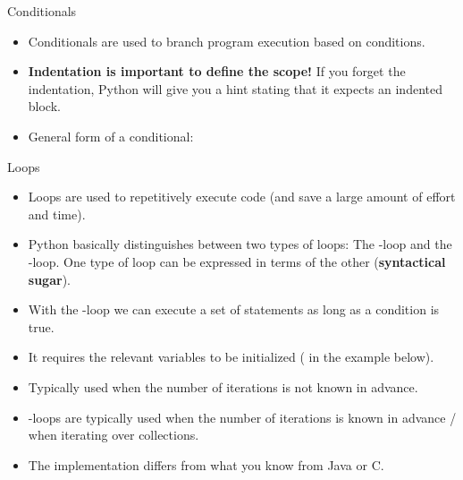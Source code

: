 \begin{frame}
	
\end{frame}



\begin{dwHeaderFrame}{Conditionals}
	\begin{itemize}
		\item Conditionals are used to branch program execution based on conditions.
		\item \textbf{Indentation is important to define the scope!} If you forget the indentation,
			Python will give you a hint stating that it expects an indented block.
		\item General form of a conditional:
	\end{itemize}
	
	
\end{dwHeaderFrame}


\begin{dwHeaderFrame}{Loops}
	\begin{itemize}
		\item Loops are used to repetitively execute code (and save a large amount of effort and time).
		\item Python basically distinguishes between two types of loops: The -loop and the -loop.
			One type of loop can be expressed in terms of the other (\textbf{syntactical sugar}).
	\end{itemize}
	
	\begin{itemize}
		\item With the -loop we can execute a set of statements as long as a condition is true.
		\item It requires the relevant variables to be initialized ( in the example below).
		\item Typically used when the number of iterations is not known in advance.
	\end{itemize}
	
	
\end{dwHeaderFrame}


\begin{frame}
	\begin{itemize}
		\item {}-loops are typically used when the number of iterations is known in advance / when iterating over collections.
		\item The implementation differs from what you know from Java or C.
	\end{itemize}
	
	
\end{frame}


